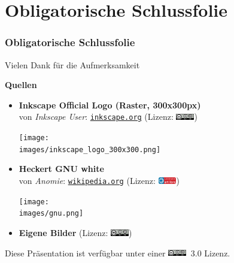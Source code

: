 \documentclass[german]{beamer} %
\newcommand{\images}{vektorzeichnen/}
\newcommand{\ccbysa}{\href{https://creativecommons.org/licenses/by-sa/3.0/deed.de}{\includegraphics[height=0.11in]{img/licenses/cc-by-sa.png}}}
\newcommand{\artlibre}{\href{http://artlibre.org/licence/lal/de/}{\includegraphics[height=0.11in]{img/licenses/art_libre.png}}}
\begin{document}












 

\section{Obligatorische Schlussfolie}
\begin{frame}
  \frametitle{Obligatorische Schlussfolie}
  
  \begin{block}{Vielen Dank für die Aufmerksamkeit}\end{block}
  
  \textbf{Quellen}
  \begin{itemize}
  	\item \textbf{Inkscape Official Logo (Raster, 300x300px)}\\ von \textit{Inkscape User}: \href{https://inkscape.org/en/gallery/item/1088/}{\texttt{inkscape.org}} (Lizenz: \ccbysa) \par
  	        \begin{minipage}{\linewidth}
  	            \centering
  	            \texttt{[image: \\images/inkscape\_logo\_300x300.png]}
  	        \end{minipage}
  			

  	\item \textbf{Heckert GNU white}\\ von \textit{Anomie}: \href{https://en.wikipedia.org/wiki/File:Heckert_GNU_white.svg}{\texttt{wikipedia.org}} (Lizenz: \artlibre) \par
  	        \begin{minipage}{\linewidth}
  	            \centering
  	            \texttt{[image: \\images/gnu.png]}
  	        \end{minipage}
  			
  	\item \textbf{Eigene Bilder} (Lizenz: \ccbysa)
  \end{itemize}
  
  \begin{block}{Diese Präsentation ist verfügbar unter einer \ccbysa $\ $ 3.0 Lizenz.}\end{block}
  
 \end{frame}

\end{document}
